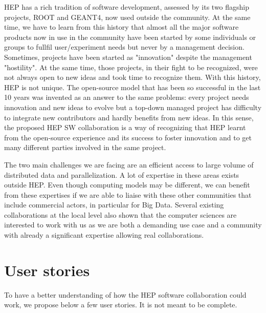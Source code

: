 \documentclass[11pt]{article} %
\begin{document}
HEP has a rich tradition of software development, assessed by its two
flagship projects, ROOT and GEANT4, now used outside the community. At
the same time, we have to learn from this history that almost all the
major software products now in use in the community have been started
by some individuals or groups to fullfil user/experiment needs but
never by a management decision. Sometimes, projects have been started
as "innovation" despite the management "hostility". At the same time,
those projects, in their fight to be recognized, were not always open
to new ideas and took time to recognize them. With this history, HEP
is not unique. The open-source model that has been so successful in
the last 10 years was invented as an answer to the same problems:
every project needs innovation and new ideas to evolve but a top-down
managed project has difficulty to integrate new contributors and
hardly benefits from new ideas. In this sense, the proposed HEP SW
collaboration is a way of recognizing that HEP learnt from the
open-source experience and its success to foster innovation and to get
many different parties involved in the same project.

The two main challenges we are facing are an efficient access to large
volume of distributed data and parallelization. A lot of expertise in
these areas exists outside HEP. Even though computing models may be
different, we can benefit from these expertises if we are able to
liaise with these other communities that include commercial actors,
in particular for Big Data. Several existing collaborations at the
local level also shown that the computer sciences are interested to
work with us as we are both a demanding use case and a community with
already a significant expertise allowing real collaborations.


\section{User stories}
To have a better understanding of how the HEP software collaboration could work, we propose below a few user stories. It is not meant to be complete.
\end{document}
